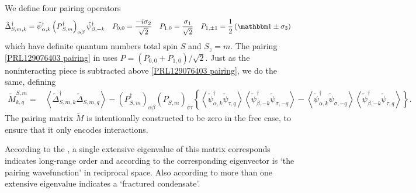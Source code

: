 We define four pairing operators
\begin{align}
    \tilde{\Delta}\adjoint_{S,m,k} &= \tilde{\psi}\adjoint_{\alpha,k} \left(P\adjoint_{S,m}\right)_{\alpha\beta} \tilde{\psi}\adjoint_{\beta,-k}
    &
    P_{0,0} &= \frac{-i \sigma_2}{\sqrt{2}}
    &
    P_{1,0} &= \frac{\sigma_1}{\sqrt{2}}
    &
    P_{1,\pm1} &= \oneover{2}\left( \one \pm \sigma_3 \right)
\end{align}
which have definite quantum numbers total spin $S$ and $S_z=m$.
The pairing \eqref{PRL129076403 pairing} in  uses $P = (P_{0,0} + P_{1,0})/\sqrt{2}$.
Just as the noninteracting piece is subtracted above \eqref{PRL129076403 pairing}, we do the same, defining
\begin{align}
    \tilde{M}^{S,m}_{k,q} =&
      \left\langle \tilde{\Delta}^\dagger_{S,m,k} \tilde{\Delta}_{S,m,q} \right\rangle
    - \left(P^\dagger_{S,m}\right)_{\alpha\beta} \left(P^{\phantom{\dagger}}_{S,m}\right)_{\sigma\tau} \left\{
            \left\langle \tilde{\psi}^\dagger_{\alpha, k} \tilde{\psi}_{\tau, q} \right\rangle \left\langle \tilde{\psi}^\dagger_{\beta, -k} \tilde{\psi}_{\sigma, -q} \right\rangle
        -   \left\langle \tilde{\psi}^\dagger_{\alpha, k} \tilde{\psi}_{\sigma, -q} \right\rangle \left\langle \tilde{\psi}^\dagger_{\beta, -k} \tilde{\psi}_{\tau, q} \right\rangle
    \right\}.
    \label{eq:pairing matrix}
\end{align}
The pairing matrix $\tilde{M}$ is intentionally constructed to be zero in the free case, to ensure that it only encodes interactions.

According to the , a single extensive eigenvalue of this matrix corresponds indicates long-range order and according to  the corresponding eigenvector is `the pairing wavefunction' in reciprocal space.
Also according to  more than one extensive eigenvalue indicates a `fractured condensate'.

